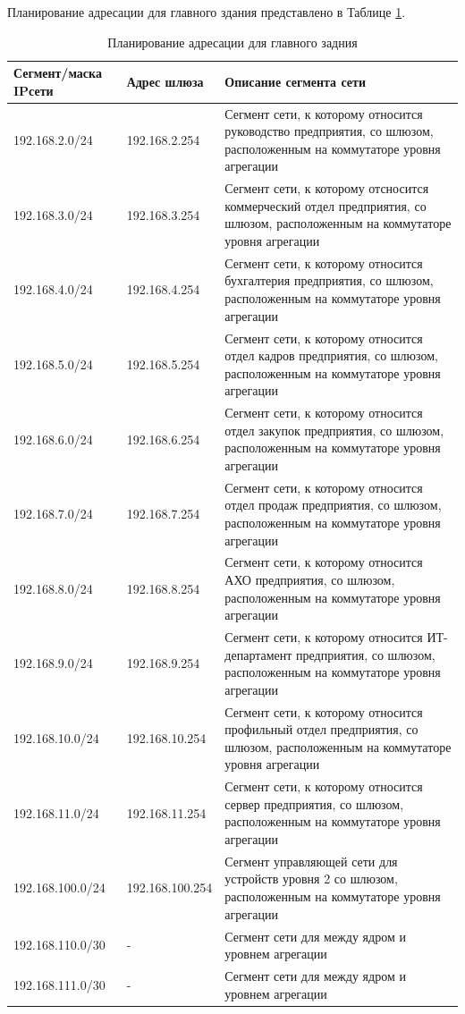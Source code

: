 \documentclass[14pt, a4paper]{extarticle}
\numberwithin{equation}{section}
\begin{document}
Планирование адресации для главного здания представлено в Таблице \ref{table:mainDepIpPlan}.
\begin{table}[H]
\centering
\small
\caption{Планирование адресации для главного задния}
\label{table:mainDepIpPlan}
\begin{tabular}{|m{4cm}|m{3cm}|m{8cm}|}
\hline
\textbf{Сегмент/маска IPсети} & \textbf{Адрес шлюза} & \textbf{Описание сегмента сети} \\
\hline
192.168.2.0/24 & 192.168.2.254 & Сегмент сети, к которому относится руководство предприятия, со шлюзом, расположенным на коммутаторе уровня агрегации
\\ \hline
192.168.3.0/24 & 192.168.3.254 & Сегмент сети, к которому отсносится коммерческий отдел предприятия, со шлюзом, расположенным на коммутаторе уровня агрегации
\\ \hline
192.168.4.0/24 & 192.168.4.254 & Сегмент сети, к которому относится бухгалтерия предприятия, со шлюзом, расположенным на коммутаторе уровня агрегации
\\ \hline
192.168.5.0/24 & 192.168.5.254 & Сегмент сети, к которому относится отдел кадров предприятия, со шлюзом, расположенным на коммутаторе уровня агрегации
\\ \hline
192.168.6.0/24 & 192.168.6.254 & Сегмент сети, к которому относится отдел закупок предприятия, со шлюзом, расположенным на коммутаторе уровня агрегации
\\ \hline
192.168.7.0/24 & 192.168.7.254 & Сегмент сети, к которому относится отдел продаж предприятия, со шлюзом, расположенным на коммутаторе уровня агрегации
\\ \hline
192.168.8.0/24 & 192.168.8.254 & Сегмент сети, к которому относится АХО предприятия, со шлюзом, расположенным на коммутаторе уровня агрегации
\\ \hline
192.168.9.0/24 & 192.168.9.254 & Сегмент сети, к которому относится ИТ-департамент предприятия, со шлюзом, расположенным на коммутаторе уровня агрегации
\\ \hline
192.168.10.0/24 & 192.168.10.254 & Сегмент сети, к которому относится профильный отдел предприятия, со шлюзом, расположенным на коммутаторе уровня агрегации
\\ \hline
192.168.11.0/24 & 192.168.11.254 & Сегмент сети, к которому относится сервер предприятия, со шлюзом, расположенным на коммутаторе уровня агрегации
\\ \hline
192.168.100.0/24 & 192.168.100.254 & Сегмент управляющей сети для устройств уровня 2 со шлюзом, расположенным на коммутаторе уровня агрегации 
\\ \hline
192.168.110.0/30 & - & Сегмент сети для между ядром и уровнем агрегации
\\ \hline
192.168.111.0/30 & - & Сегмент сети для между ядром и уровнем агрегации
\\ \hline
\end{tabular}
\end{table}
\end{document}
